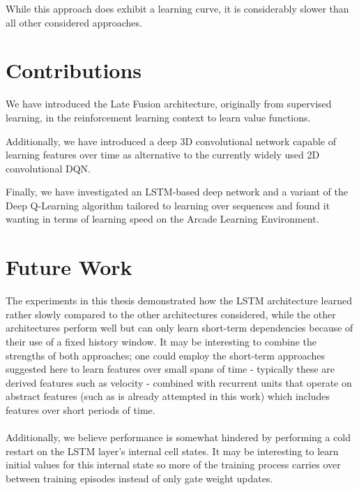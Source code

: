While this approach does exhibit a learning curve,
it is considerably slower than all other considered approaches.

\section{Contributions}
\label{sec:contributions}
We have introduced the Late Fusion architecture,
originally from supervised learning,
in the reinforcement learning context
to learn value functions.

Additionally,
we have introduced a deep 3D convolutional network
capable of learning features over time
as alternative to the currently widely used 2D convolutional DQN.

Finally,
we have investigated an LSTM-based deep network
and a variant of the Deep Q-Learning algorithm
tailored to learning over sequences
and found it wanting in terms of learning speed
on the Arcade Learning Environment.

\section{Future Work}
\label{sec:future_work}
The experiments in this thesis
demonstrated how the LSTM architecture learned rather slowly
compared to the other architectures considered,
while the other architectures perform well
but can only learn short-term dependencies
because of their use of a fixed history window.
It may be interesting to combine the strengths of both approaches;
one could employ the short-term approaches suggested here
to learn features over small spans of time
- typically these are derived features such as velocity -
combined with recurrent units that operate
on abstract features
(such as is already attempted in this work)
which includes features over short periods of time.

\paragraph{}
Additionally,
we believe performance is somewhat hindered
by performing a cold restart on the LSTM layer's
internal cell states.
It may be interesting to learn initial values
for this internal state
so more of the training process carries over
between training episodes
instead of only gate weight updates.
